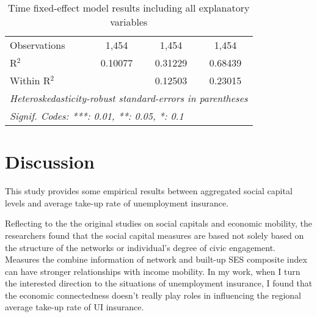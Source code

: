 \documentclass{article}
\begin{document}
\begin{table}[h!]
\begin{tabular}{lccc}
      Observations                 & 1,454          & 1,454          & 1,454\\  
      R$^2$                        & 0.10077        & 0.31229        & 0.68439\\  
      Within R$^2$                 &                & 0.12503        & 0.23015\\  
      \midrule \midrule
      \multicolumn{4}{l}{\emph{Heteroskedasticity-robust standard-errors in parentheses}}\\
      \multicolumn{4}{l}{\emph{Signif. Codes: ***: 0.01, **: 0.05, *: 0.1}}\\
   \end{tabular}
   \caption{Time fixed-effect model results including all explanatory variables}
   \label{result4}
\end{table}

\newpage
\section{Discussion}

This study provides some empirical results between aggregated social capital levels and average take-up rate of unemployment insurance. 

Reflecting to the the original studies on social capitals and economic mobility, the researchers found that the social capital measures are based not solely based on the structure of the networks or individual's degree of civic engagement. Measures the combine information of network and built-up SES composite index can have stronger relationships with income mobility. In my work, when I turn the interested direction to the situations of unemployment insurance, I found that the economic connectedness doesn't really play roles in influencing the regional average take-up rate of UI insurance. 
\end{document}
